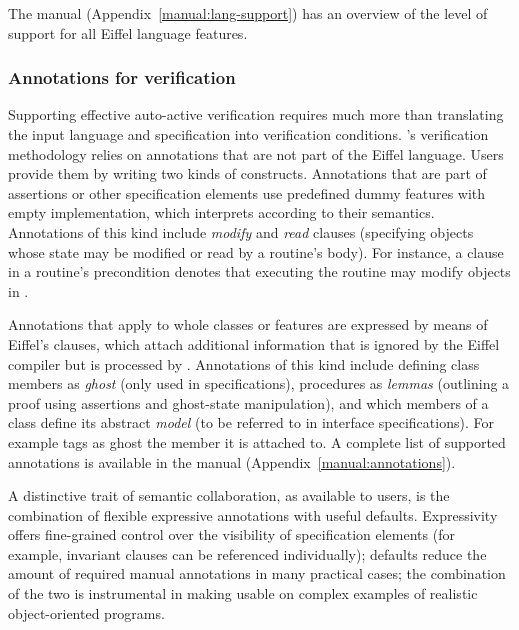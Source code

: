 The \AutoProof manual (Appendix~\ref{manual:lang-support}) has an overview of the level of support for all Eiffel language features.

\subsubsection{Annotations for verification}

Supporting effective auto-active verification requires much more than translating the input language and specification into verification conditions.
\AutoProof's verification methodology relies on annotations that are not part of the Eiffel language.
Users provide them by writing two kinds of constructs.
Annotations that are part of assertions or other specification elements use predefined dummy features with empty implementation, which \AutoProof interprets according to their semantics.
Annotations of this kind include \emph{modify} and \emph{read} clauses (specifying objects whose state may be modified or read by a routine's body).
For instance, a clause  in a routine's precondition denotes that executing the routine may modify objects in .

Annotations that apply to whole classes or features are expressed by means of Eiffel's  clauses, which attach additional information that is ignored by the Eiffel compiler but is processed by \AutoProof.
Annotations of this kind include defining class members as \emph{ghost} (only used in specifications), procedures as \emph{lemmas} (outlining a proof using assertions and ghost-state manipulation), and which members of a class define its abstract \emph{model} (to be referred to in interface specifications).
For example  tags as ghost the member it is attached to.
A complete list of supported annotations is available in the \AutoProof manual (Appendix~\ref{manual:annotations}).

A distinctive trait of semantic collaboration, as available to \AutoProof users, is the combination of flexible expressive annotations with useful defaults.
Expressivity offers fine-grained control over the visibility of specification elements (for example, invariant clauses can be referenced individually); defaults reduce the amount of required manual annotations in many practical cases; the combination of the two is instrumental in making \AutoProof usable on complex examples of realistic object-oriented programs.


